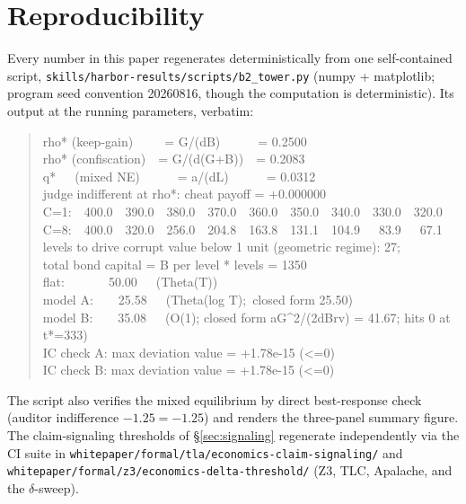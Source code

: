 \documentclass[11pt,a4paper]{article}
\begin{document}
\section{Reproducibility}\label{sec:repro}
Every number in this paper regenerates deterministically from one self-contained script, \texttt{skills/harbor-results/scripts/b2\_tower.py} (numpy + matplotlib; program seed convention 20260816, though the computation is deterministic). Its output at the running parameters, verbatim:
\begin{quote}\small\ttfamily
rho* (keep-gain)~~~~~= G/(dB)~~~~~~= 0.2500 \\
rho* (confiscation)~~= G/(d(G+B))~~= 0.2083 \\
q*~~~(mixed NE)~~~~~~= a/(dL)~~~~~~= 0.0312 \\
judge indifferent at rho*: cheat payoff = +0.000000 \\
C=1:~~400.0~~390.0~~380.0~~370.0~~360.0~~350.0~~340.0~~330.0~~320.0 \\
C=8:~~400.0~~320.0~~256.0~~204.8~~163.8~~131.1~~104.9~~~83.9~~~67.1 \\
levels to drive corrupt value below 1 unit (geometric regime): 27; \\
total bond capital = B per level * levels = 1350 \\
flat:~~~~~~~50.00~~~(Theta(T)) \\
model A:~~~~25.58~~~(Theta(log T);~closed form 25.50) \\
model B:~~~~35.08~~~(O(1); closed form aG\^{}2/(2dBrv) = 41.67; hits 0 at t*=333) \\
IC check A: max deviation value = +1.78e-15 (<=0) \\
IC check B: max deviation value = +1.78e-15 (<=0)
\end{quote}
The script also verifies the mixed equilibrium by direct best-response check (auditor indifference $-1.25 = -1.25$) and renders the three-panel summary figure. The claim-signaling thresholds of \S\ref{sec:signaling} regenerate independently via the CI suite in \texttt{whitepaper/formal/tla/economics-claim-signaling/} and \texttt{whitepaper/formal/z3/economics-delta-threshold/} (Z3, TLC, Apalache, and the $\delta$-sweep).
\end{document}
